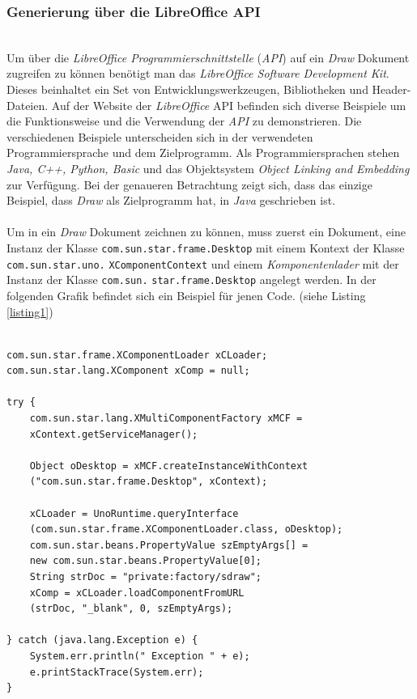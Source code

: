 \subsubsection{Generierung über die LibreOffice API}

\hon{}
\\
\noindent
Um über die \textit{LibreOffice Programmierschnittstelle} (\textit{API}) auf ein \textit{Draw} Dokument zugreifen zu können benötigt man das \textit{LibreOffice Software Development Kit}. Dieses beinhaltet ein Set von Entwicklungswerkzeugen, Bibliotheken und Header-Dateien.
Auf der Website der \textit{LibreOffice} API befinden sich diverse Beispiele um die Funktionsweise und die Verwendung der \textit{API} zu demonstrieren. Die verschiedenen Beispiele unterscheiden sich in der verwendeten Programmiersprache und dem Zielprogramm. Als Programmiersprachen stehen \textit{Java, C++, Python, Basic} und das Objektsystem \textit{Object Linking and Embedding} zur Verfügung. Bei der genaueren Betrachtung zeigt sich, dass das einzige Beispiel, dass \textit{Draw} als Zielprogramm hat, in \textit{Java} geschrieben ist. 
\\
\hon{}
\\

\noindent
Um in ein \textit{Draw} Dokument zeichnen zu können, muss zuerst ein Dokument, eine Instanz der Klasse \verb|com.sun.star.frame.Desktop| mit einem Kontext der Klasse \verb|com.sun.star.uno.| \verb|XComponentContext| und einem \textit{Komponentenlader} mit der Instanz der Klasse \verb|com.sun.| \verb|star.frame.Desktop| angelegt werden. In der folgenden Grafik befindet sich ein Beispiel für jenen Code. (siehe Listing \ref{listing1})

\noindent
\hon{}
\lstset{language=Java}
\lstset{frame=lines}
\lstset{basicstyle=\footnotesize}
\begin{lstlisting}

com.sun.star.frame.XComponentLoader xCLoader;
com.sun.star.lang.XComponent xComp = null;

try {
    com.sun.star.lang.XMultiComponentFactory xMCF = 
    xContext.getServiceManager();

    Object oDesktop = xMCF.createInstanceWithContext
    ("com.sun.star.frame.Desktop", xContext);

    xCLoader = UnoRuntime.queryInterface
    (com.sun.star.frame.XComponentLoader.class, oDesktop);
    com.sun.star.beans.PropertyValue szEmptyArgs[] = 
    new com.sun.star.beans.PropertyValue[0];
    String strDoc = "private:factory/sdraw";
    xComp = xCLoader.loadComponentFromURL
    (strDoc, "_blank", 0, szEmptyArgs);

} catch (java.lang.Exception e) {
    System.err.println(" Exception " + e);
    e.printStackTrace(System.err);
}
\end{lstlisting}

